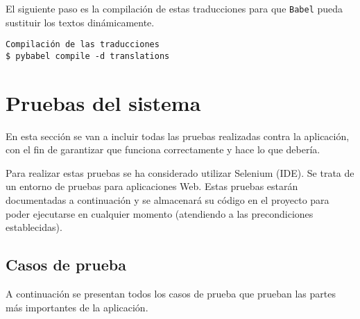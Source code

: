 El siguiente paso es la compilación de estas traducciones para que \texttt{Babel} pueda sustituir
los textos dinámicamente.

\begin{tcolorbox}[colback=cyan!5!white,colframe=cyan!75!black,fontupper=\footnotesize,title=Compilación de traducciones (desde \texttt{/web/app})]
\begin{verbatim}
Compilación de las traducciones
$ pybabel compile -d translations 
\end{verbatim}
\end{tcolorbox}

\section{Pruebas del sistema}

En esta sección se van a incluir todas las pruebas realizadas contra la
aplicación, con el fin de garantizar que funciona correctamente y hace lo que
debería.

Para realizar estas pruebas se ha considerado utilizar Selenium (IDE). Se trata
de un entorno de pruebas para aplicaciones Web. Estas pruebas estarán
documentadas a continuación y se almacenará su código en el proyecto para poder
ejecutarse en cualquier momento (atendiendo a las precondiciones establecidas).

\subsection{Casos de prueba}

A continuación se presentan todos los casos de prueba que prueban las partes más
importantes de la aplicación.

